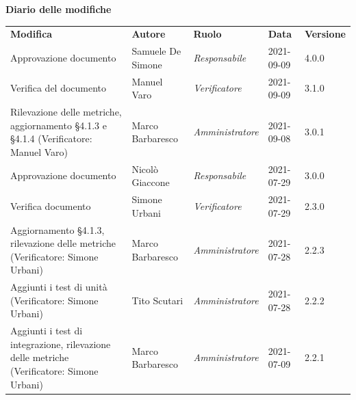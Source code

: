 \documentclass[a4paper]{article}
\begin{document}
\begin{center}
    \centering
    \textbf{\Large Diario delle modifiche}\\
    \vspace{10px}
    \renewcommand{\arraystretch}{1.8}
    \label{tab:Diario delle modifiche}
    \begin{longtable}[!h]{p{160px} p{80px} p{70px} p{55px} p{40px}}
        \rowcolor{logo!70} \textbf{Modifica}                                                               & \textbf{Autore}   & \textbf{Ruolo}          & \textbf{Data} & \textbf{Versione} \\
        Approvazione documento                                                                             & Samuele De Simone & \textit{Responsabile}   & 2021-09-09    & 4.0.0             \\
        Verifica del documento                                                                             & Manuel Varo       & \textit{Verificatore}   & 2021-09-09    & 3.1.0             \\
        Rilevazione delle metriche, aggiornamento \S 4.1.3 e \S 4.1.4 \newline (Verificatore: Manuel Varo) & Marco Barbaresco  & \textit{Amministratore} & 2021-09-08    & 3.0.1             \\
        Approvazione documento                                                                             & Nicolò Giaccone   & \textit{Responsabile}   & 2021-07-29    & 3.0.0             \\
        Verifica documento \newline                                                                        & Simone Urbani     & \textit{Verificatore}   & 2021-07-29    & 2.3.0             \\
        Aggiornamento \S 4.1.3, rilevazione delle metriche \newline (Verificatore: Simone Urbani)          & Marco Barbaresco  & \textit{Amministratore} & 2021-07-28    & 2.2.3             \\
        Aggiunti i test di unità \newline (Verificatore: Simone Urbani)                                    & Tito Scutari      & \textit{Amministratore} & 2021-07-28    & 2.2.2             \\
        Aggiunti i test di integrazione, rilevazione delle metriche \newline (Verificatore: Simone Urbani) & Marco Barbaresco  & \textit{Amministratore} & 2021-07-09    & 2.2.1             \\

\end{longtable}
\end{center}
\end{document}

